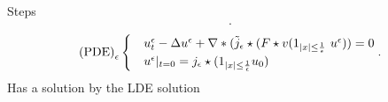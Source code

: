 \documentclass[10pt]{beamer}
\DeclarePairedDelimiter\abs{\lvert}{\rvert}
\begin{document}
\begin{frame}{Steps} 
  \begin{align*}
  .\end{align*}
   \begin{align*}
   \text{(PDE)}_{\epsilon}\begin{cases}
    &u_t^{\epsilon} - \Delta u^{\epsilon}  + \nabla*(\tilde j_{\epsilon}\star (F \star  v (1_{\abs{x}\le \frac{1}{\epsilon}} \ u^{\epsilon})) = 0\\
    &u^{\epsilon}  \rvert_{t=0} = {j}_{\epsilon} \star (1_{\abs{x}\le \frac{1}{\epsilon}}  u_{0} )
  \end{cases}
   .\end{align*}
   Has a solution by the LDE solution
\end{frame}
\end{document}
